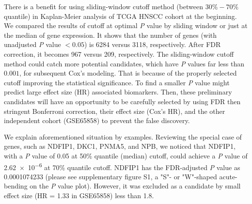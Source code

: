 \documentclass[jpm,article,submit,moreauthors,pdftex]{Definitions/mdpi}
\newenvironment{MyColorPar}[1]{%
    \leavevmode\color{#1}\ignorespaces%
}{%
}%
\begin{document}
\begin{paracol}{2}
\begin{MyColorPar}{red}
There is a benefit for using sliding-window cutoff method (between $30\% - 70\%$ quantile) in Kaplan-Meier analysis of TCGA HNSCC cohort at the beginning.
We compared the results of cutoff at optimal \textit{P} value by sliding window or just at the median of gene expression.
It shows that the number of genes (with unadjusted \textit{P} value $< 0.05$)  is 6284 versus 3118, respectively. After FDR correction, it becomes 967 versus 209, respectively.
The sliding-window cutoff method could catch more potential candidates, which have \textit{P} values far less than $0.001$, for subsequent Cox's modeling.
That is because of the properly selected cutoff improving the statistical significance.
To find a smaller \textit{P} value might predict large effect size (HR) associated biomarkers.
Then, these preliminary candidates will have an opportunity to be carefully selected by using FDR then stringent Bonferroni correction, their effect size (Cox's HR), and the other independent cohort (GSE65858) to prevent the false discovery.

We explain aforementioned situation by examples.
Reviewing the special case of genes, such as NDFIP1, DKC1, PNMA5, and NPB,
we noticed that NDFIP1, with a \textit{P} value of 0.05 at 50\% quantile (median) cutoff, could achieve a \textit{P} value of \num{2.62e-6} at 70\% quantile cutoff.
NDFIP1 has the FDR-adjusted \textit{P} value as \num[round-precision=3, round-mode=figures,
scientific-notation=true]{0.0001074233} (please see supplementary figure S1, a "S"- or "W"-shaped acute-bending on the \textit{P} value plot). %
However, it was excluded as a candidate by small effect size (HR = 1.33 in GSE65858) less than 1.8.


\end{MyColorPar}
\end{paracol}
\end{document}
